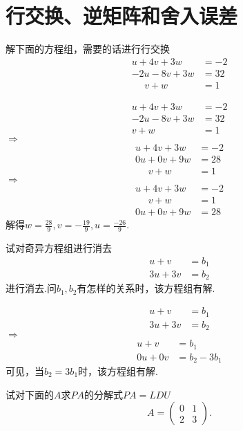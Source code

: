 ﻿\documentclass{book} \usepackage{exsheets} \usepackage{xeCJK}
\begin{document}
\section{行交换、逆矩阵和舍入误差}
\begin{question}
  解下面的方程组，需要的话进行行交换
  \begin{align*}
    u+4v+3w&=-2\\
    -2u-8v+3w&=32\\
    ~~~~~~v+w&=1
  \end{align*}
\end{question}
\begin{solution}
  \begin{align*}
    u+4v+3w&=-2\\
    -2u-8v+3w&=32\\
    v+w&=1
  \end{align*}$\Rightarrow$
  \begin{align*}
    u+4v+3w&=-2\\
    0u+0v+9w&=28\\
    ~~~~~~v+w&=1
  \end{align*}$\Rightarrow$
  \begin{align*}
    u+4v+3w&=-2\\
    ~~~~~~v+w&=1\\
    0u+0v+9w&=28
  \end{align*}
  解得$w=\frac{28}{9},v=-\frac{19}{9},u=\frac{-26}{9}$.
\end{solution}
\begin{question}
  试对奇异方程组进行消去
  \begin{align*}
    u+v&=b_1\\
    3u+3v&=b_{2}
  \end{align*}
  进行消去.问$b_1,b_2$有怎样的关系时，该方程组有解.
\end{question}
\begin{solution}
  \begin{align*}
    u+v&=b_1\\
    3u+3v&=b_2
  \end{align*}$\Rightarrow$
  \begin{align*}
    u+v&=b_1\\
    0u+0v&=b_2-3b_1
  \end{align*}
  可见，当$b_2=3b_1$时，该方程组有解.
\end{solution}
\begin{question}
  试对下面的$A$求$PA$的分解式$PA=LDU$
$$
A=
\begin{pmatrix}
  0&1\\
  2&3
\end{pmatrix}.
$$
\end{question}
\end{document}
